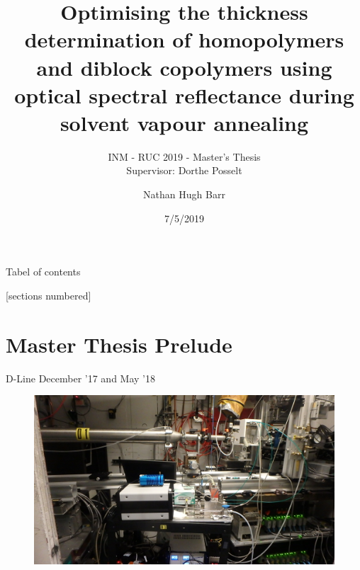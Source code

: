 \documentclass[10pt]{beamer}
\title{Optimising the thickness determination of homopolymers and diblock copolymers using optical spectral reflectance during solvent vapour annealing}
\subtitle{INM - RUC 2019 - Master's Thesis \\ Supervisor: Dorthe Posselt}
\date{7/5/2019}
\author{Nathan Hugh Barr}
\institute{Roskilde University}
\begin{document}
\maketitle

\begin{frame}{Tabel of contents}
\begin{multicols}{2}
[sections numbered]
\tableofcontents[hideallsubsections]
\end{multicols}
\end{frame}


	\section{Master Thesis Prelude}


\begin{frame}{D-Line}
December '17 and May '18
	\begin{figure}
		\includegraphics[scale=0.15]{chess3.JPG}
	\end{figure}
\end{frame}
\end{document}
